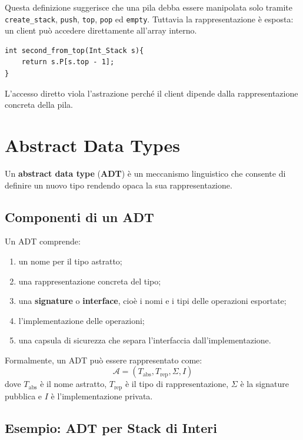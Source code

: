 \documentclass{article}
\begin{document}
Questa definizione suggerisce che una pila debba essere manipolata solo tramite \texttt{create\_stack}, \texttt{push}, \texttt{top}, \texttt{pop} ed \texttt{empty}. Tuttavia la rappresentazione è esposta: un client può accedere direttamente all'array interno.

\begin{lstlisting}
int second_from_top(Int_Stack s){
    return s.P[s.top - 1];
}
\end{lstlisting}

L'accesso diretto viola l'astrazione perché il client dipende dalla rappresentazione concreta della pila.

\section{Abstract Data Types}

Un \textbf{abstract data type} (\textbf{ADT}) è un meccanismo linguistico che consente di definire un nuovo tipo rendendo opaca la sua rappresentazione.

\subsection{Componenti di un ADT}

Un ADT comprende:
\begin{enumerate}
  \item un nome per il tipo astratto;
  \item una rappresentazione concreta del tipo;
  \item una \textbf{signature} o \textbf{interface}, cioè i nomi e i tipi delle operazioni esportate;
  \item l'implementazione delle operazioni;
  \item una capsula di sicurezza che separa l'interfaccia dall'implementazione.
\end{enumerate}

Formalmente, un ADT può essere rappresentato come:
\[
\mathcal{A} = (T_{\mathrm{abs}}, T_{\mathrm{rep}}, \Sigma, I)
\]
dove $T_{\mathrm{abs}}$ è il nome astratto, $T_{\mathrm{rep}}$ è il tipo di rappresentazione, $\Sigma$ è la signature pubblica e $I$ è l'implementazione privata.

\subsection{Esempio: ADT per Stack di Interi}
\end{document}
